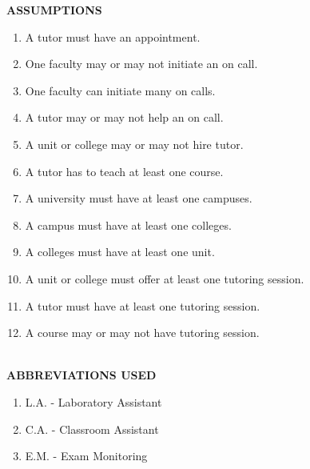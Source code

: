 \documentclass[titlepage]{article}
\begin{document}
\textbf{ASSUMPTIONS}
\begin{enumerate}
	
	\item A tutor must have an appointment.
	\item One faculty may or may not initiate an on call.
	\item One faculty can initiate many on calls.
	\item A tutor may or may not help an on call.
	\item A unit or college may or may not hire tutor.
	\item A tutor has to teach at least one course.
	\item A university must have at least one campuses.
	\item A campus must have at least one colleges.
	\item A colleges must have at least one unit.
	\item A unit or college must offer at least one tutoring session.
	\item A tutor must have at least one tutoring session.
	\item A course may or may not have tutoring session.\\\\
	
\end{enumerate}

\textbf{ABBREVIATIONS USED}
\begin{enumerate}
	
	\item L.A.  - Laboratory Assistant
	\item C.A. - Classroom Assistant
	\item E.M. - Exam Monitoring

\end{enumerate}
\end{document}
